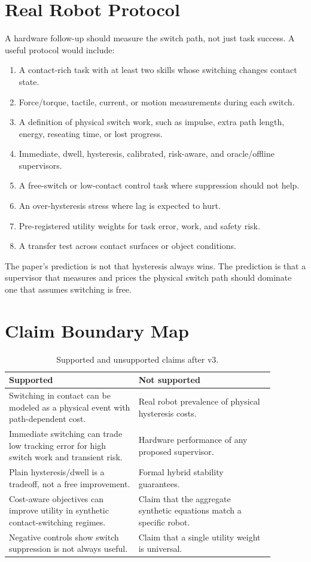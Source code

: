\documentclass{article}
\begin{document}
\section{Real Robot Protocol}

A hardware follow-up should measure the switch path, not just task success.
A useful protocol would include:

\begin{enumerate}
    \item A contact-rich task with at least two skills whose switching changes contact state.
    \item Force/torque, tactile, current, or motion measurements during each switch.
    \item A definition of physical switch work, such as impulse, extra path length, energy, reseating time, or lost progress.
    \item Immediate, dwell, hysteresis, calibrated, risk-aware, and oracle/offline supervisors.
    \item A free-switch or low-contact control task where suppression should not help.
    \item An over-hysteresis stress where lag is expected to hurt.
    \item Pre-registered utility weights for task error, work, and safety risk.
    \item A transfer test across contact surfaces or object conditions.
\end{enumerate}

The paper's prediction is not that hysteresis always wins.
The prediction is that a supervisor that measures and prices the physical switch path should dominate one that assumes switching is free.

\section{Claim Boundary Map}

\begin{table}[h]
\centering
\caption{Supported and unsupported claims after v3.}
\small
\begin{tabular}{p{0.43\linewidth}p{0.45\linewidth}}
\toprule
Supported & Not supported \\
\midrule
Switching in contact can be modeled as a physical event with path-dependent cost. & Real robot prevalence of physical hysteresis costs. \\
Immediate switching can trade low tracking error for high switch work and transient risk. & Hardware performance of any proposed supervisor. \\
Plain hysteresis/dwell is a tradeoff, not a free improvement. & Formal hybrid stability guarantees. \\
Cost-aware objectives can improve utility in synthetic contact-switching regimes. & Claim that the aggregate synthetic equations match a specific robot. \\
Negative controls show switch suppression is not always useful. & Claim that a single utility weight is universal. \\
\bottomrule
\end{tabular}
\end{table}
\end{document}
